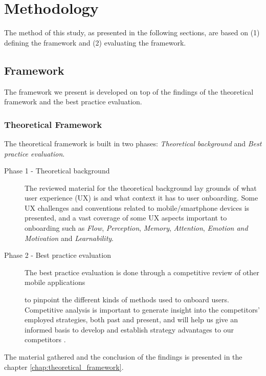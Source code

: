 \chapter{Methodology}
\label{chap:methodology}

The method of this study, as presented in the following sections, are based on (1) defining the framework and (2)
 evaluating the framework.
\section{Framework}
The framework we present is developed on top of the findings of the theoretical framework and the best practice evaluation.

\subsection{Theoretical Framework}
The theoretical framework is built in two phases: \textit{Theoretical background} and \textit{Best practice evaluation}.

\begin{description}
  \item [Phase 1 - Theoretical background] The reviewed material for the theoretical background lay grounds of what user experience (UX) is and what context it has to user onboarding. Some UX challenges and conventions related to mobile/smartphone devices is presented, and a vast coverage of some UX aspects important to onboarding such as \textit{Flow}, \textit{Perception}, \textit{Memory}, \textit{Attention}, \textit{Emotion and Motivation} and \textit{Learnability}.
  \item [Phase 2 - Best practice evaluation] The best practice evaluation is done through a competitive review \cite{Schade2013} of other mobile applications  to pinpoint the different kinds of methods used to onboard users. Competitive analysis is important to generate insight into the competitors' employed strategies, both past and present, and will help us give an informed basis to develop and establish strategy advantages to our competitors \cite{Wilson2010}.
\end{description}

The material gathered and the conclusion of the findings is presented in the chapter \ref{chap:theoretical_framework}.

